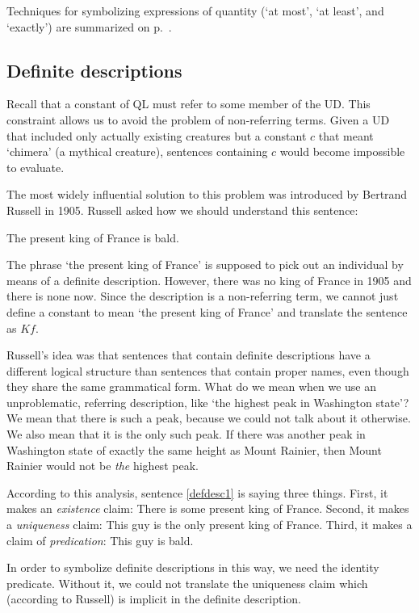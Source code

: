 Techniques for symbolizing expressions of quantity (`at most', `at least', and `exactly') are summarized on p.~\pageref{summary.atleast}.


\subsection{Definite descriptions}
\label{subsec.defdesc}
Recall that a constant of QL must refer to some member of the UD. This constraint allows us to avoid the problem of non-referring terms. Given a UD that included only actually existing creatures but a constant $c$ that meant `chimera' (a mythical creature), sentences containing $c$ would become impossible to evaluate.

The most widely influential solution to this problem was introduced by Bertrand Russell in 1905. Russell asked how we should understand this sentence:
\begin{earg}
\item[\ex{defdesc1}] The present king of France is bald.
\end{earg}
The phrase `the present king of France' is supposed to pick out an individual by means of a definite description. However, there was no king of France in 1905 and there is none now. Since the description is a non-referring term, we cannot just define a constant to mean `the present king of France' and translate the sentence as $Kf$.

Russell's idea was that sentences that contain definite descriptions have a different logical structure than sentences that contain proper names, even though they share the same grammatical form. What do we mean when we use an unproblematic, referring description, like `the highest peak in Washington state'? We mean that there is such a peak, because we could not talk about it otherwise. We also mean that it is the only such peak. If there was another peak in Washington state of exactly the same height as Mount Rainier, then Mount Rainier would not be \emph{the} highest peak.

According to this analysis, sentence \ref{defdesc1} is saying three things. First, it makes an \emph{existence} claim: There is some present king of France. Second, it makes a \emph{uniqueness} claim: This guy is the only present king of France. Third, it makes a claim of \emph{predication}: This guy is bald.

In order to symbolize definite descriptions in this way, we need the identity predicate. Without it, we could not translate the uniqueness claim which (according to Russell) is implicit in the definite description.

